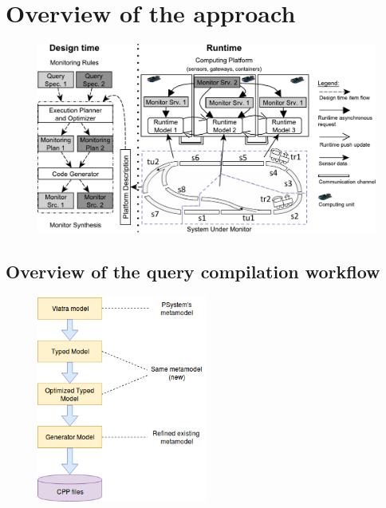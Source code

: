 
\chapter{Overview of the approach}



\begin{figure}[h]
	\begin{center}
		\includegraphics[width=\textwidth]{figures/fase-overview-crop.pdf}
	\end{center}
\end{figure}




\section{Overview of the query compilation workflow}

\begin{figure}[h]
	\begin{center}
		\includegraphics[width=0.5\textwidth]{figures/workflow.png}
	\end{center}
\end{figure}



